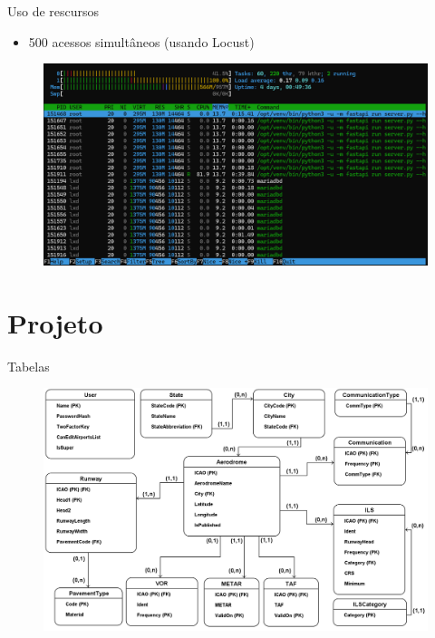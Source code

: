 \documentclass{beamer}
\begin{document}
\begin{frame}{Uso de rescursos}
    \begin{itemize}
        \item 500 acessos simultâneos (usando Locust)
    \end{itemize}
    
    \begin{figure}[ht]
        \begin{center}
        \includegraphics[width=0.8\linewidth]{img/server-500-acessos.png}
        \label{fig:arquitetura}
        \end{center}
    \end{figure}
\end{frame}


\section{Projeto}

\begin{frame}{Tabelas}
    \begin{figure}[ht]
        \begin{center}
        \includegraphics[width=0.8\linewidth]{img/ERAero.png}
        \label{fig:arquitetura}
        \end{center}
    \end{figure}
\end{frame}
\end{document}
